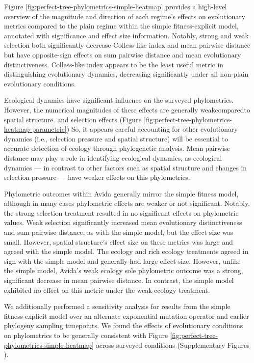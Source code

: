 Figure \ref{fig:perfect-tree-phylometrics-simple-heatmap} provides a high-level overview of the magnitude and direction of each regime's effects on evolutionary metrics compared to the plain regime within the simple fitness-explicit model, annotated with significance and effect size information.
Notably, strong and weak selection both significantly decrease Colless-like index and mean pairwise distance but have opposite-sign effects on sum pairwise distance and mean evolutionary distinctiveness.
Colless-like index appears to be the least useful metric in distinguishing evolutionary dynamics, decreasing significantly under all non-plain evolutionary conditions.

Ecological dynamics have significant influence on the surveyed phylometrics.
However, the numerical magnitudes of these effects are generally weakcomparedto spatial structure. and selection effects (Figure \ref{fig:perfect-tree-phylometrics-heatmap-parametric})
So, it appears careful accounting for other evolutionary dynamics (i.e., selection pressure and spatial structure) will be essential to accurate detection of ecology through phylogenetic analysis.
Mean pairwise distance may play a role in identifying ecological dynamics, as ecological dynamics --- in contrast to other factors such as spatial structure and changes in selection pressure --- have weaker effects on this phylometrics.

Phylometric outcomes within Avida generally mirror the simple fitness model, although in many cases phylometric effects are weaker or not significant.
Notably, the strong selection treatment resulted in no significant effects on phylometric values.
Weak selection significantly increased mean evolutionary distinctiveness and sum pairwise distance, as with the simple model, but the effect size was small.
However, spatial structure's effect size on these metrics was large and agreed with the simple model.
The ecology and rich ecology treatments agreed in sign with the simple model and generally had large effect size.
However, unlike the simple model, Avida's weak ecology sole phylometric outcome was a strong, significant decrease in mean pairwise distance.
In contrast, the simple model exhibited no effect on this metric under the weak ecology treatment.

We additionally performed a sensitivity analysis for results from the simple fitness-explicit model over an alternate exponential mutation operator and earlier phylogeny sampling timepoints.
We found the effects of evolutionary conditions on phylometrics to be generally consistent with Figure \ref{fig:perfect-tree-phylometrics-simple-heatmap} across surveyed conditions (Supplementary Figures ).

